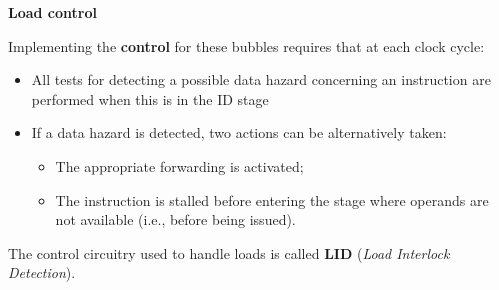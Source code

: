 \documentclass[a4paper,11pt]{article}
\begin{document}
\par\smallskip
\textbf{\textsf{Load control}}

Implementing the \textbf{control} for these bubbles requires that at each clock cycle:
\begin{itemize}
	\item All tests for detecting a possible data hazard concerning an instruction are performed when this is in the ID stage
	\item If a data hazard is detected, two actions can be alternatively taken:
	      \begin{itemize}
		      \item The appropriate forwarding is activated;
		      \item The instruction is stalled before entering the stage where operands are not available (i.e., before being issued).
	      \end{itemize}
\end{itemize}

\par\smallskip

The control circuitry used to handle loads is called \textbf{LID} (\textit{Load Interlock Detection}).
\end{document}
